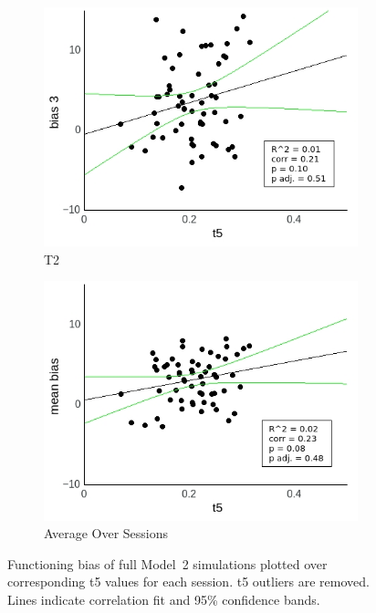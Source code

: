 \documentclass[a4paper]{scrreprt}
\begin{document}
\begin{figure}
\begin{subfigure}[b]{0.49\textwidth}
        \includegraphics[width=\textwidth]{figs/sec3/t5/t5no_diff_3_mod2mod2.jpeg}
        \caption{T2}
    \end{subfigure}
    \begin{subfigure}[b]{0.49\textwidth}
        \includegraphics[width=\textwidth]{figs/sec3/t5/t5no_diff_mean_mod2mod2.jpeg}
        \caption{Average Over Sessions}
    \end{subfigure}
\caption{Functioning bias of full Model~2 simulations plotted over corresponding t5 values for each session. t5 outliers are removed. Lines indicate correlation fit and 95\% confidence bands.}
\label{fig:t5no_diff_mod2mod2}
\end{figure}
\end{document}
